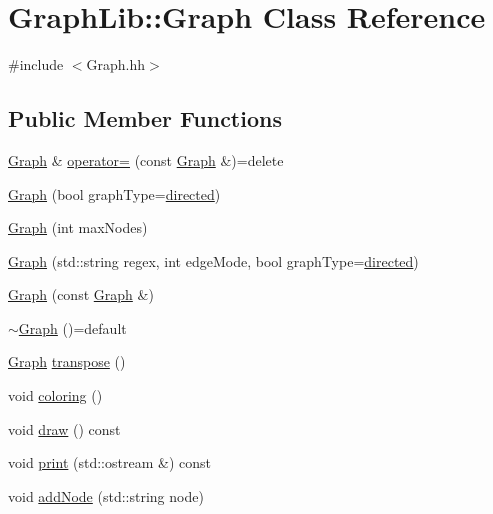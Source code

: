 \hypertarget{classGraphLib_1_1Graph}{\section{Graph\-Lib\-:\-:Graph Class Reference}
\label{classGraphLib_1_1Graph}
}


{\ttfamily \#include $<$Graph.\-hh$>$}

\subsection*{Public Member Functions}
\begin{DoxyCompactItemize}
\item 
\hyperlink{classGraphLib_1_1Graph}{Graph} \& \hyperlink{classGraphLib_1_1Graph_acf3c67e9e04fd94b80556ccbfa492a2d}{operator=} (const \hyperlink{classGraphLib_1_1Graph}{Graph} \&)=delete
\item 
\hyperlink{classGraphLib_1_1Graph_ab8f9277bc44213e8ec100eccfdc4a33e}{Graph} (bool graph\-Type=\hyperlink{classGraphLib_1_1Graph_a3111bb6cc59aedbc4290ed1b37668336}{directed})
\item 
\hyperlink{classGraphLib_1_1Graph_ac4887b3f5b96f81d4a96afb591fc34e6}{Graph} (int max\-Nodes)
\item 
\hyperlink{classGraphLib_1_1Graph_a7e3fbf053855797d1da4df1421ee216f}{Graph} (std\-::string regex, int edge\-Mode, bool graph\-Type=\hyperlink{classGraphLib_1_1Graph_a3111bb6cc59aedbc4290ed1b37668336}{directed})
\item 
\hyperlink{classGraphLib_1_1Graph_a3fb8d04de0175ec4005ee57564a8802c}{Graph} (const \hyperlink{classGraphLib_1_1Graph}{Graph} \&)
\item 
\hyperlink{classGraphLib_1_1Graph_a40bde368ad387204b3e1407fe6c93f51}{$\sim$\-Graph} ()=default
\item 
\hyperlink{classGraphLib_1_1Graph}{Graph} \hyperlink{classGraphLib_1_1Graph_a13f6b627345753c59f03600b2dbc8113}{transpose} ()
\item 
void \hyperlink{classGraphLib_1_1Graph_abce64a2d34a4329d5342e575e467b49f}{coloring} ()
\item 
void \hyperlink{classGraphLib_1_1Graph_afd5a738fcda8957e55066fb1f5a6e59c}{draw} () const 
\item 
void \hyperlink{classGraphLib_1_1Graph_a74beaae9726da79271fd26beef29ba49}{print} (std\-::ostream \&) const 
\item 
void \hyperlink{classGraphLib_1_1Graph_a864bb472478c4ec26ed9641763a82cd2}{add\-Node} (std\-::string node)

\end{DoxyCompactItemize}
